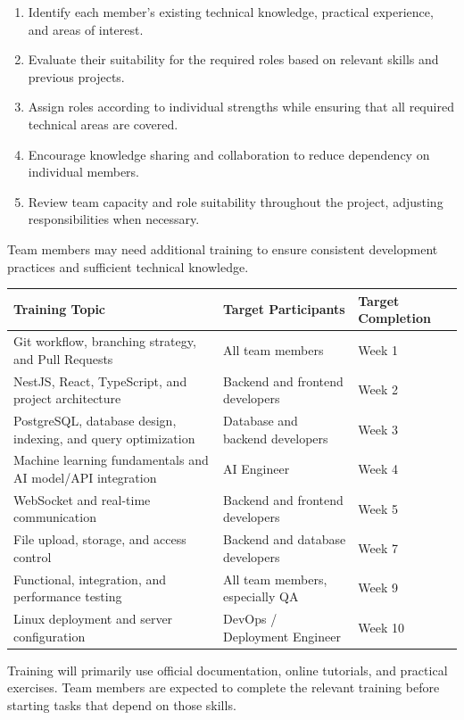 \documentclass[12pt]{article}
\renewcommand{\baselinestretch}{1.5}
\begin{document}
\begin{enumerate}
\item Identify each member's existing technical knowledge, practical experience, and areas of interest.
\par
\item Evaluate their suitability for the required roles based on relevant skills and previous projects.
\par
\item Assign roles according to individual strengths while ensuring that all required technical areas are covered.
\par
\item Encourage knowledge sharing and collaboration to reduce dependency on individual members.
\par
\item Review team capacity and role suitability throughout the project, adjusting responsibilities when necessary.
\par
\end{enumerate}
Team members may need additional training to ensure consistent development practices and sufficient technical knowledge.
\par\medskip
\begingroup
\scriptsize
\renewcommand{\baselinestretch}{1.0}\selectfont
\renewcommand{\arraystretch}{1.15}
\setlength{\tabcolsep}{4pt}
\begin{longtable}{|>{\raggedright\arraybackslash}p{}|>{\raggedright\arraybackslash}p{}|>{\raggedright\arraybackslash}p{}|}
\hline
Training Topic & Target Participants & Target Completion \\ \hline
\endhead
Git workflow, branching strategy, and Pull Requests & All team members & Week 1 \\ \hline
NestJS, React, TypeScript, and project architecture & Backend and frontend developers & Week 2 \\ \hline
PostgreSQL, database design, indexing, and query optimization & Database and backend developers & Week 3 \\ \hline
Machine learning fundamentals and AI model/\allowbreak{}API integration & AI Engineer & Week 4 \\ \hline
WebSocket and real-time communication & Backend and frontend developers & Week 5 \\ \hline
File upload, storage, and access control & Backend and database developers & Week 7 \\ \hline
Functional, integration, and performance testing & All team members, especially QA & Week 9 \\ \hline
Linux deployment and server configuration & DevOps /\allowbreak{} Deployment Engineer & Week 10 \\ \hline
\end{longtable}
\endgroup
\par\medskip
Training will primarily use official documentation, online tutorials, and practical exercises. Team members are expected to complete the relevant training before starting tasks that depend on those skills.
\par\medskip
\hypertarget{sec:43-project-monitoring-and-control}{}
\end{document}

